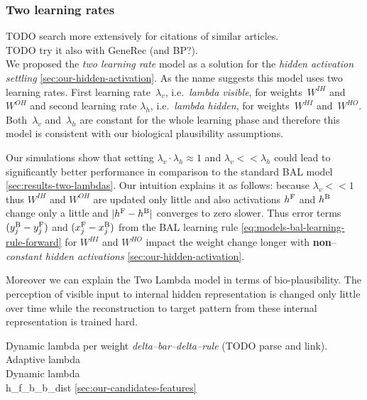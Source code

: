 
\subsubsection{Two learning rates} 
\label{sec:our-two-lambdas}

TODO search more extensively for citations of similar articles. \\
TODO try it also with GeneRec (and BP?).  \\ 

We proposed the \emph{two learning rate} model as a solution for the \emph{hidden activation settling} \ref{sec:our-hidden-activation}. As the name suggests this model uses two learning rates. First learning rate~$\lambda_v$, i.e.~\emph{lambda visible}, for weights~$W^{IH}$ and~$W^{OH}$ and second learning rate $\lambda_h$, i.e.~\emph{lambda hidden}, for weights~$W^{HI}$ and~$W^{HO}$. Both~$\lambda_v$ and~$\lambda_h$ are constant for the whole learning phase and therefore this model is consistent with our biological plausibility assumptions. 

Our simulations show that setting $\lambda_v \cdot \lambda_h \approx 1$ and $\lambda_v << \lambda_h$ could lead to significantly better performance in comparison to the standard BAL model \ref{sec:results-two-lambdas}. Our intuition explains it as follows: because $\lambda_v << 1$ thus $W^{IH}$ and $W^{OH}$ are updated only little and also activations $h^{\rm F}$ and $h^{\rm B}$ change only a little and $|h^{\rm F}- h^{\rm B}|$ converges to zero slower. Thus error terms $(y_j^{\rm B} - y_j^{\rm F})$ and $(x_j^{\rm F} - x_j^{\rm B})$ from the BAL learning rule \ref{eq:models-bal-learning-rule-forward} for $W^{HI}$ and $W^{HO}$ impact the weight change longer with {\bf non}--\emph{constant hidden activations} \ref{sec:our-hidden-activation}. 

Moreover we can explain the Two Lambda model in terms of bio-plausibility. The perception of visible input to internal hidden representation is changed only little over time while the reconstruction to target pattern from these internal representation is trained hard. 

Dynamic lambda per weight \emph{delta--bar--delta--rule} \citep{jacobs1988increased} (TODO parse and link). \\
Adaptive lambda \citep{riedmiller1993direct} \\
Dynamic lambda \citep{yu1997efficient} \\ 

h\_f\_b\_b\_dist \ref{sec:our-candidates-features}


